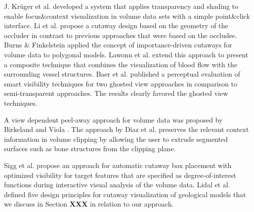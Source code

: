 J. Kr{\"u}ger et al. \cite{kruger06} developed a system that applies transparency and shading to enable focus\&context visualization in volume data sets with a simple point\&click interface.
Li et al. \cite{Li07} propose a cutaway design based on the geometry of the occluder in contrast to previous approaches that were based on the occludee.
Burns \& Finkelstein \cite{Burns08} applied the concept of importance-driven cutaways for volume data to polygonal models.
Lawonn et al. \cite{lawonn16} extend this approach to present a composite technique that combines the visualization of blood flow with the surrounding vessel structures. %
Baer et al. \cite{baer11} published a perceptual evaluation of smart visibility techniques for two ghosted view approaches in comparison to semi-transparent approaches. The results clearly favored the ghosted view techniques.

A view dependent peel-away approach for volume data was proposed by Birkeland and Viola \cite{birkeland09}. The approach by Diaz et al. \cite{diaz12} preserves the relevant context information in volume clipping by allowing the user to extrude segmented surfaces such as bone structures from the clipping plane.

Sigg et al. \cite{sigg12} propose an approach for automatic cutaway box placement with optimized visibility for target features that are specified as degree-of-interest functions during interactive visual analysis of the volume data. Lidal et al. \cite{Lidal12} defined five design principles for cutaway visualization of geological models %
that we discuss in Section \textbf{XXX} in relation to our approach. 

